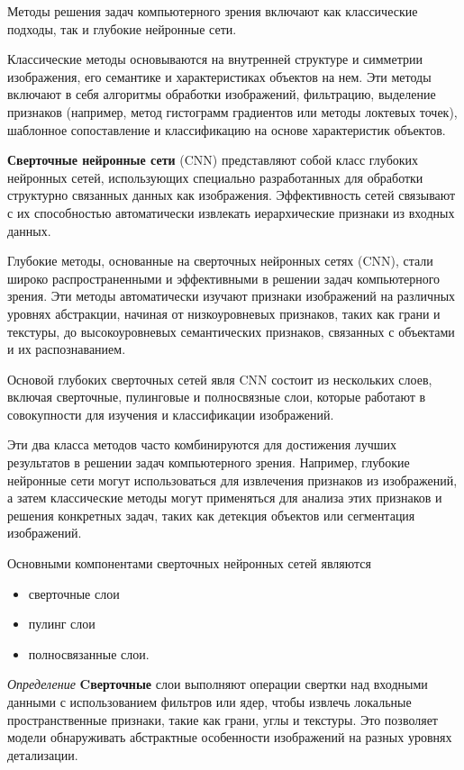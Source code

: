 
Методы решения задач компьютерного зрения включают как классические подходы, так и глубокие нейронные сети.

Классические методы основываются на внутренней структуре и симметрии изображения, 
его семантике и характеристиках объектов на нем. 
Эти методы включают в себя алгоритмы обработки изображений,
 фильтрацию, выделение признаков (например, метод гистограмм градиентов или методы локтевых точек),
  шаблонное сопоставление и классификацию на основе характеристик объектов.

\textbf{Сверточные нейронные сети} (CNN)\cite{lecun1989handwritten} представляют собой класс глубоких нейронных сетей,
использующих
специально разработанных для обработки структурно связанных данных как изображения. 
Эффективность сетей связывают с их способностью автоматически извлекать иерархические признаки из входных данных.

Глубокие методы, основанные на сверточных нейронных сетях (CNN), 
стали широко распространенными и эффективными в решении задач компьютерного зрения. 
Эти методы автоматически изучают признаки изображений на различных уровнях абстракции, 
начиная от низкоуровневых признаков, таких как грани и текстуры, до высокоуровневых семантических признаков,
 связанных с объектами и их распознаванием. 
 
Основой глубоких сверточных сетей явля 
CNN состоит из нескольких слоев, включая сверточные, пулинговые и полносвязные слои, которые работают в совокупности для изучения и классификации изображений.

Эти два класса методов часто комбинируются для достижения лучших результатов в решении задач компьютерного зрения. Например, глубокие нейронные сети могут использоваться для извлечения признаков из изображений, а затем классические методы могут применяться для анализа этих признаков и решения конкретных задач, таких как детекция объектов или сегментация изображений.



Основными компонентами сверточных нейронных сетей являются \begin{itemize}
    \item сверточные слои
    \item пулинг слои
    \item полносвязанные слои.
\end{itemize}

\textit{Определение} \textbf{Cверточные} слои выполняют операции свертки над входными данными с использованием фильтров или ядер, 
чтобы извлечь локальные пространственные признаки, такие как грани, углы и текстуры. Это позволяет модели обнаруживать абстрактные особенности изображений на разных уровнях детализации.

